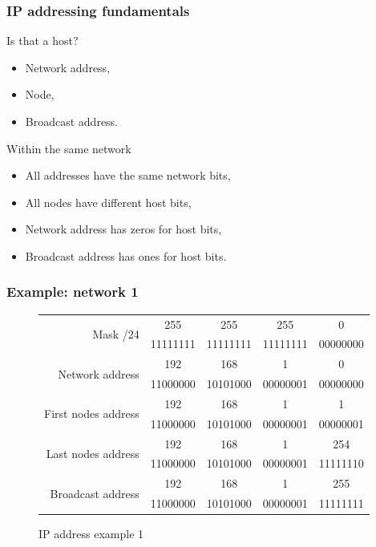   \begin{frame}
    \frametitle{IP addressing fundamentals}
    \begin{block}{Is that a host?}
      \begin{itemize}
        \item Network address,\pause
        \item Node,\pause
        \item Broadcast address.\pause
      \end{itemize}
    \end{block}
    \begin{block}{Within the same network}
      \begin{itemize}
        \item All addresses have the same network bits,\pause
        \item All nodes have different host bits,\pause
        \item Network address has zeros for host bits,\pause
        \item Broadcast address has ones for host bits.
      \end{itemize}
    \end{block}
  \end{frame}

  \begin{frame}
    \frametitle{Example: network 1}
    \begin{figure}
        \centering
      \begin{tabular}{|r|cccc|}
        \hline
        \multirow{2}{*}{Mask /24} & {\color{brown}255} & {\color{brown}255} & {\color{brown}255} & {\color{brown}0} \\
        & {\color{brown}11111111} & {\color{brown}11111111} & {\color{brown}11111111} & {\color{brown}00000000} \\ \hline
        \multirow{2}{*}{Network address} & \color{brown}192 & \color{brown}168 & \color{brown}1 & \color{blue}0 \\
        & \color{brown}11000000 & \color{brown}10101000 & \color{brown}00000001 & \color{blue}00000000 \\ \hline
        \multirow{2}{*}{First nodes address} & \color{brown}192 & \color{brown}168 & \color{brown}1 & \color{blue}1 \\
        & \color{brown}11000000 & \color{brown}10101000 & \color{brown}00000001 & \color{blue}00000001 \\ \hline
        \multirow{2}{*}{Last nodes address} & \color{brown}192 & \color{brown}168 & \color{brown}1 & \color{blue}254 \\
        & \color{brown}11000000 & \color{brown}10101000 & \color{brown}00000001 & \color{blue}11111110 \\ \hline
        \multirow{2}{*}{Broadcast address} & \color{brown}192 & \color{brown}168 & \color{brown}1 & \color{blue}255 \\
        & \color{brown}11000000 & \color{brown}10101000 & \color{brown}00000001 & \color{blue}11111111 \\ \hline
      \end{tabular}
      \caption{IP address example 1}
    \end{figure}
  \end{frame}

